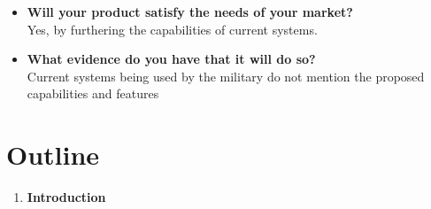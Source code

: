 \documentclass[man]{article}
\begin{document}
\begin{itemize}
      \item \textbf{Will your product satisfy the needs of your market?}
      ~\\Yes, by furthering the capabilities of current systems.

      \item \textbf{What evidence do you have that it will do so?}
      ~\\Current systems being used by the military do not mention the proposed capabilities and features
    \end{itemize}
  \newpage



  \section{Outline}
    \begin{enumerate}
      \item \textbf{Introduction}
        \begin{enumerate}

\end{enumerate}
\end{enumerate}
\end{document}
